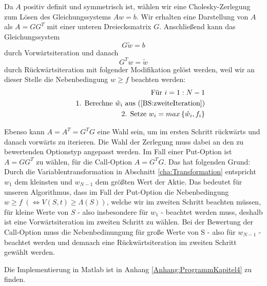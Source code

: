 Da $A$ positiv definit und symmetrisch ist, wählen wir eine Cholesky-Zerlegung zum Lösen des Gleichungssystems $Aw =b$. Wir erhalten eine Darstellung von $A$ als $A = GG^T$ mit einer unteren Dreiecksmatrix $G$. Anschließend kann das Gleichungssystem 
\begin{equation}
G\tilde w = b \label{BS:ersteIteration}
\end{equation}
durch Vorwärtsiteration und danach
\begin{equation}
G^T w = \tilde w \label{BS:zweiteIteration}
\end{equation}
durch Rückwärtsiteration mit folgender Modifikation gelöst werden, weil wir an dieser Stelle die Nebenbedingung $w\geq f$ beachten werden:
\begin{eqnarray}
& &\text{Für }i = 1:N-1\nonumber \\
& &\quad\text{1. Berechne }\hat w_i \text{ aus (\ref{BS:zweiteIteration})} \label{BS:dritteIteration}\\
& &\quad\text{2. Setze }w_i = max\left\{\hat w_i, f_i\right\} \label{BS:vierteIteration}
\end{eqnarray}

Ebenso kann $A = A^T = G^TG$ eine Wahl sein, um im ersten Schritt rückwärts und danach vorwärts zu iterieren. Die Wahl der Zerlegung muss dabei an den zu bewertenden Optionstyp angepasst werden. Im Fall einer Put-Option ist $A=GG^T$ zu wählen, für die Call-Option $A=G^TG$. Das hat folgenden Grund: Durch die Variablentransformation in Abschnitt \ref{cha:Transformation} entspricht $w_1$ dem kleinsten und $w_{N-1}$ dem größten Wert der Aktie. Das bedeutet für unseren Algorithmus, dass im Fall der Put-Option die Nebenbedingung $w\geq f \; \left(\Leftrightarrow V(S,t) \geq \Lambda(S)\right)$, welche wir im zweiten Schritt beachten müssen, für kleine Werte von $S$ -  also insbesondere für $w_1$ -  beachtet werden muss, deshalb ist eine Vorwärtsiteration im zweiten Schritt zu wählen. Bei der Bewertung der Call-Option muss die Nebenbedinungung für große Werte von S - also für $w_{N-1}$ - beachtet werden und demnach eine Rückwärtsiteration im zweiten Schritt gewählt werden.

Die Implementierung in Matlab ist in Anhang \ref{Anhang:ProgrammKapitel4} zu finden.


